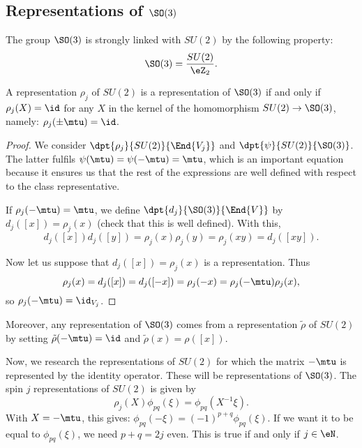 \subsection{Representations of \texorpdfstring{$\SO(3)$}{SO3}}\label{pg:reprez_SOt}

The group $\SO(3)$ is strongly linked with $SU(2)$ by the following property:
\begin{equation}        \label{EqSOSUeZ}
   \SO(3)=\frac{SU(2)}{\eZ_2}.
\end{equation}

\begin{lemma}
A representation $\rho_j$ of $SU(2)$ is a representation of $\SO(3)$ if and only if $\rho_j(X)=\id$ for any $X$ in the kernel of the homomorphism $SU(2)\to \SO(3)$, namely: $\rho_j(\pm\mtu)=\id$.
\label{lem:SO_3}
\end{lemma}

\begin{proof}
We consider $\dpt{\rho_j}{SU(2)}{\End{V_j}}$ and $\dpt{\psi}{SU(2)}{\SO(3)}$. The latter fulfils $\psi(\mtu)=\psi(-\mtu)=\mtu$, which is an important equation because it ensures us that the rest of the expressions are well defined with respect to the class representative.

If $\rho_j(-\mtu)=\mtu$, we define $\dpt{d_j}{\SO(3)}{\End{V}}$ by $d_j([x])=\rho_j(x)$ (check that this is well defined). With this,
\[
  d_j([x])d_j([y])=\rho_j(x)\rho_j(y)=\rho_j(xy)=d_j([xy]).
\]

Now let us suppose that $d_j([x])=\rho_j(x)$ is a representation. Thus
\[
  \rho_j(x)=d_j([x])=d_j([-x])=\rho_j(-x)=\rho_j(-\mtu)\rho_j(x),
\]
so $\rho_j(-\mtu)=\id_{V_j}$.

\end{proof}

Moreover, any representation of $\SO(3)$ comes from a representation $\tilde\rho$ of $SU(2)$ by setting $\tilde\rho(-\mtu)=\id$ and $\tilde\rho(x)=\rho([x])$.

Now, we research the representations of $SU(2)$ for which the matrix $-\mtu$ is represented by the identity operator. These will be representations of $\SO(3)$. The spin $j$ representations of $SU(2)$ is given by
\[
   \rho_j(X)\phi_{pq}(\xi)=\phi_{pq}(X^{-1}\xi).
\]
With $X=-\mtu$, this gives: $\phi_{pq}(-\xi)=(-1)^{p+q}\phi_{pq}(\xi)$. If we want it to be equal to $\phi_{pq}(\xi)$, we need $p+q=2j$ even. This is true if and only if $j\in\eN$.

